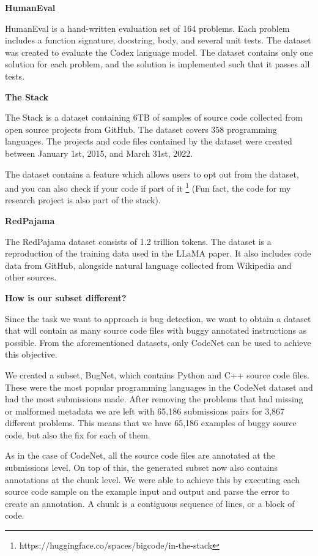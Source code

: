 \documentclass[12pt,a4paper]{report}
\begin{document}
\textbf{HumanEval}

HumanEval \cite{chen2021evaluating} is a hand-written evaluation set of 164 problems. Each problem includes a function signature, docstring, body, and several unit tests. The dataset was created to evaluate the Codex language model. The dataset contains only one solution for each problem, and the solution is implemented such that it passes all tests.

\textbf{The Stack}

The Stack \cite{Kocetkov2022TheStack} is a dataset containing 6TB of samples of source code collected from open source projects from GitHub. The dataset covers 358 programming languages. The projects and code files contained by the dataset were created between January 1st, 2015, and March 31st, 2022.

The dataset contains a feature which allows users to opt out from the dataset, and you can also check if your code if part of it \footnote{https://huggingface.co/spaces/bigcode/in-the-stack} (Fun fact, the code for my research project is also part of the stack).

\textbf{RedPajama}

The RedPajama \cite{together2023redpajama} dataset consists of 1.2 trillion tokens. The dataset is a reproduction of the training data used in the LLaMA paper. It also includes code data from GitHub, alongside natural language collected from Wikipedia and other sources.

\textbf{How is our subset different?}

Since the task we want to approach is bug detection, we want to obtain a dataset that will contain as many source code files with buggy annotated instructions as possible. From the aforementioned datasets, only CodeNet can be used to achieve this objective.

We created a subset, BugNet, which contains Python and C++ source code files. These were the most popular programming languages in the CodeNet dataset and had the most submissions made. After removing the problems that had missing or malformed metadata we are left with 65,186 submissions pairs for 3,867 different problems. This means that we have 65,186 examples of buggy source code, but also the fix for each of them.

As in the case of CodeNet, all the source code files are annotated at the submissions level. On top of this, the generated subset now also contains annotations at the chunk level. We were able to achieve this by executing each source code sample on the example input and output and parse the error to create an annotation. A chunk is a contiguous sequence of lines, or a block of code.
\end{document}
